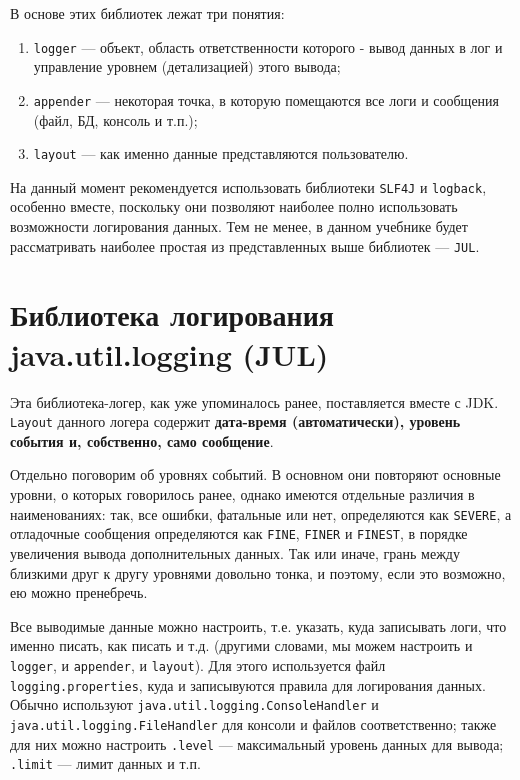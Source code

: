 В основе этих библиотек лежат три понятия:

\begin{enumerate}
    \item \verb|logger| — объект, область ответственности которого - вывод данных в лог и управление уровнем (детализацией) этого вывода;
    \item \verb|appender| — некоторая точка, в которую помещаются все логи и сообщения (файл, БД, консоль и т.п.);
    \item \verb|layout| — как именно данные представляются пользователю.
\end{enumerate}

На данный момент рекомендуется использовать библиотеки \verb|SLF4J| и \verb|logback|, особенно вместе, поскольку они позволяют наиболее полно использовать возможности логирования данных. Тем не менее, в данном учебнике будет рассматривать наиболее простая из представленных выше библиотек — \verb|JUL|.

\section{Библиотека логирования java.util.logging (JUL)}

Эта библиотека-логер, как уже упоминалось ранее, поставляется вместе с JDK. \verb|Layout| данного логера содержит \textbf{дата-время (автоматически), уровень события и, собственно, само сообщение}.

Отдельно поговорим об уровнях событий. В основном они повторяют основные уровни, о которых говорилось ранее, однако имеются отдельные различия в наименованиях: так, все ошибки, фатальные или нет, определяются как \verb|SEVERE|, а отладочные сообщения определяются как \verb|FINE|, \verb|FINER| и \verb|FINEST|, в порядке увеличения вывода дополнительных данных. Так или иначе, грань между близкими друг к другу уровнями довольно тонка, и поэтому, если это возможно, ею можно пренебречь.

Все выводимые данные можно настроить, т.е. указать, куда записывать логи, что именно писать, как писать и т.д. (другими словами, мы можем настроить и \verb|logger|, и \verb|appender|, и \verb|layout|). Для этого используется файл \verb|logging.properties|, куда и записывуются правила для логирования данных. Обычно используют \verb|java.util.logging.ConsoleHandler| и \verb|java.util.logging.FileHandler| для консоли и файлов соответственно; также для них можно настроить \verb|.level| — максимальный уровень данных для вывода; \verb|.limit| — лимит данных и т.п.

